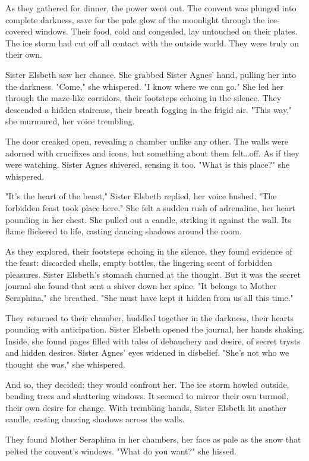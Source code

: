\documentclass[11pt]{article}
\begin{document}
As they gathered for dinner, the power went out. The convent was plunged into complete darkness, save for the pale glow of the moonlight through the ice-covered windows. Their food, cold and congealed, lay untouched on their plates. The ice storm had cut off all contact with the outside world. They were truly on their own.

Sister Elsbeth saw her chance. She grabbed Sister Agnes' hand, pulling her into the darkness. "Come," she whispered. "I know where we can go." She led her through the maze-like corridors, their footsteps echoing in the silence. They descended a hidden staircase, their breath fogging in the frigid air. "This way," she murmured, her voice trembling.

The door creaked open, revealing a chamber unlike any other. The walls were adorned with crucifixes and icons, but something about them felt\ldots{}off. As if they were watching. Sister Agnes shivered, sensing it too. "What is this place?" she whispered.

"It's the heart of the beast," Sister Elsbeth  replied, her voice hushed. "The forbidden feast took place here." She felt a sudden rush of adrenaline, her heart pounding in her chest. She pulled out a candle, striking it against the wall. Its flame flickered to life, casting dancing shadows around the room.

As they explored, their footsteps echoing in the silence, they found evidence of the feast: discarded shells, empty bottles, the lingering scent of forbidden pleasures. Sister Elsbeth's stomach churned at the thought. But it was the secret journal she found that sent a shiver down her spine. "It belongs to Mother Seraphina," she breathed. "She must have kept it hidden from us all this time."

They returned to their chamber, huddled together in the darkness, their hearts pounding with anticipation. Sister Elsbeth opened the journal, her hands shaking. Inside, she found pages filled with tales of debauchery and desire, of secret trysts and hidden desires. Sister Agnes' eyes widened in disbelief. "She's not who we thought she was," she whispered.

And so, they decided: they would confront her. The ice storm howled outside, bending trees and shattering windows. It seemed to mirror their own turmoil, their own desire for change. With trembling hands, Sister Elsbeth lit another candle, casting dancing shadows across the walls.

They found Mother Seraphina in her chambers, her face as pale  as the snow that pelted the convent's windows. "What do you want?" she hissed.
\end{document}
